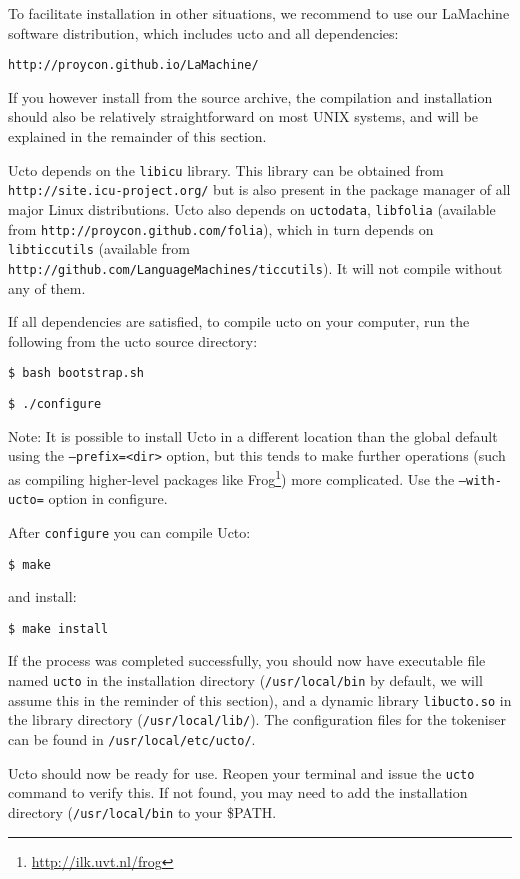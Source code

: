 \documentclass[a4paper,12pt]{report}
\begin{document}
To facilitate installation in other situations, we recommend to use our
LaMachine software distribution, which includes ucto and all dependencies:

{\tt http://proycon.github.io/LaMachine/}

If you however install from the source archive, the compilation and installation should also be relatively straightforward on most UNIX systems, and will be explained in the remainder of this section.

Ucto depends on the \texttt{libicu} library. This library can be obtained from \\
{\tt http://site.icu-project.org/} but is also present in the package manager of all major Linux distributions.
Ucto also depends on \texttt{uctodata}, \texttt{libfolia} (available from
\texttt{http://proycon.github.com/folia}), which in turn depends on
\texttt{libticcutils} (available from \\
\texttt{http://github.com/LanguageMachines/ticcutils}). It will not compile
without any of them.

If all dependencies are satisfied, to compile ucto on your computer, run the
following from the ucto source directory:

{\tt \$ bash bootstrap.sh}

{\tt \$ ./configure}

Note: It is possible to install Ucto in a different location than the global default using the \texttt{--prefix=<dir>} option, but this tends to make further operations (such as compiling higher-level packages like Frog\footnote{\url{http://ilk.uvt.nl/frog}}) more complicated. Use the {\tt --with-ucto=} option in configure.

After {\tt configure} you can compile Ucto:

{\tt \$ make}

and install:

{\tt \$ make install }

If the process was completed successfully, you should now have
executable file named {\tt ucto} in the installation directory
({\tt /usr/local/bin} by default, we will assume this in the reminder of this section), and a dynamic library {\tt libucto.so} in
the library directory ({\tt /usr/local/lib/}). The configuration files for the tokeniser can be found in {\tt /usr/local/etc/ucto/}.

Ucto should now be ready for use. Reopen your terminal and issue the {\tt ucto} command to verify this. If not found, you may need to add the installation directory ({\tt /usr/local/bin} to your \$PATH.
\end{document}
